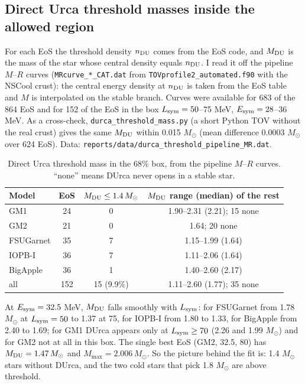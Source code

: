 \documentclass[11pt,a4paper]{article}
\newcommand{\Esym}{E_{\rm sym}}
\newcommand{\Lsym}{L_{\rm sym}}
\newcommand{\Msun}{M_\odot}
\begin{document}
\subsection{Direct Urca threshold masses inside the allowed region}\label{sec:mdu}
For each EoS the threshold density $n_{\rm DU}$ comes from the EoS code, and $M_{\rm DU}$ is the mass of the star whose central density equals $n_{\rm DU}$. I read it off the pipeline $M$--$R$ curves (\texttt{MRcurve\_*\_CAT.dat} from \texttt{TOVprofile2\_automated.f90} with the NSCool crust): the central energy density at $n_{\rm DU}$ is taken from the EoS table and $M$ is interpolated on the stable branch. Curves were available for 683 of the 864 EoS and for 152 of the EoS in the box $\Lsym=50$--75 MeV, $\Esym=28$--36 MeV. As a cross-check, \texttt{durca\_threshold\_mass.py} (a short Python TOV without the real crust) gives the same $M_{\rm DU}$ within 0.015 $\Msun$ (mean difference 0.0003 $\Msun$ over 624 EoS). Data: \texttt{reports/data/durca\_threshold\_pipeline\_MR.dat}.

\begin{table}[h]
\centering
\caption{Direct Urca threshold mass in the 68\% box, from the pipeline $M$--$R$ curves. ``none'' means DUrca never opens in a stable star.}\label{tab:mdu}
\begin{tabular}{lccc}
\toprule
Model & EoS & $M_{\rm DU}\le1.4\,\Msun$ & $M_{\rm DU}$ range (median) of the rest\\
\midrule
GM1 & 24 & 0 & 1.90--2.31 (2.21); 15 none\\
GM2 & 21 & 0 & 1.64; 20 none\\
FSUGarnet & 35 & 7 & 1.15--1.99 (1.64)\\
IOPB-I & 36 & 7 & 1.11--2.06 (1.64)\\
BigApple & 36 & 1 & 1.40--2.60 (2.17)\\
\midrule
all & 152 & 15 (9.9\%) & 1.11--2.60 (1.77); 35 none\\
\bottomrule
\end{tabular}
\end{table}

At $\Esym=32.5$ MeV, $M_{\rm DU}$ falls smoothly with $\Lsym$: for FSUGarnet from 1.78 $\Msun$ at $\Lsym=50$ to 1.37 at 75, for IOPB-I from 1.80 to 1.33, for BigApple from 2.40 to 1.69; for GM1 DUrca appears only at $\Lsym\ge70$ (2.26 and 1.99 $\Msun$) and for GM2 not at all in this box. The single best EoS (GM2, 32.5, 80) has $M_{\rm DU}=1.47\,\Msun$ and $M_{\max}=2.006\,\Msun$. So the picture behind the fit is: 1.4 $\Msun$ stars without DUrca, and the two cold stars that pick 1.8 $\Msun$ are above threshold.
\end{document}
